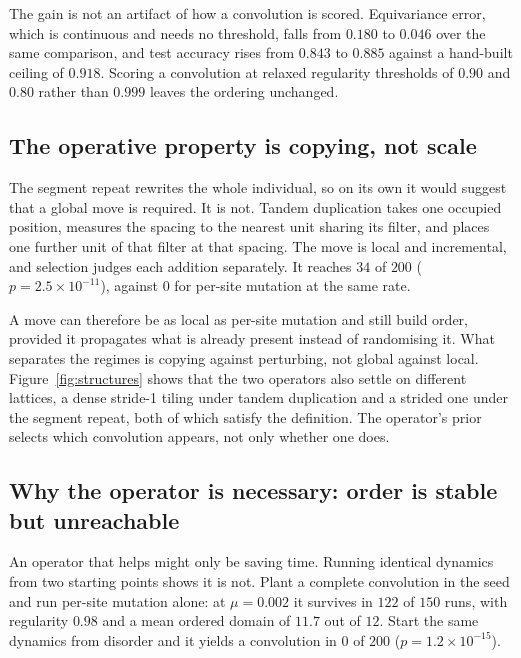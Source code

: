 \documentclass[11pt]{article}
\begin{document}
The gain is not an artifact of how a convolution is scored. Equivariance error, which is continuous and
needs no threshold, falls from $0.180$ to $0.046$ over the same comparison, and test accuracy rises from
$0.843$ to $0.885$ against a hand-built ceiling of $0.918$. Scoring a convolution at relaxed regularity
thresholds of $0.90$ and $0.80$ rather than $0.999$ leaves the ordering unchanged.

\subsection{The operative property is copying, not scale}

The segment repeat rewrites the whole individual, so on its own it would suggest that a global move is
required. It is not. Tandem duplication takes one occupied position, measures the spacing to the nearest
unit sharing its filter, and places one further unit of that filter at that spacing. The move is local
and incremental, and selection judges each addition separately. It reaches $34$ of $200$
($p = 2.5\times10^{-11}$), against $0$ for per-site mutation at the same rate.

A move can therefore be as local as per-site mutation and still build order, provided it propagates what
is already present instead of randomising it. What separates the regimes is copying against perturbing,
not global against local. Figure~\ref{fig:structures} shows that the two operators also settle on
different lattices, a dense stride-1 tiling under tandem duplication and a strided one under the segment
repeat, both of which satisfy the definition. The operator's prior selects which convolution appears, not
only whether one does.

\subsection{Why the operator is necessary: order is stable but unreachable}\label{sec:reach}

An operator that helps might only be saving time. Running identical dynamics from two starting points
shows it is not. Plant a complete convolution in the seed and run per-site mutation alone: at
$\mu = 0.002$ it survives in $122$ of $150$ runs, with regularity $0.98$ and a mean ordered domain of
$11.7$ out of $12$. Start the same dynamics from disorder and it yields a convolution in $0$ of $200$
($p = 1.2\times10^{-15}$).
\end{document}
